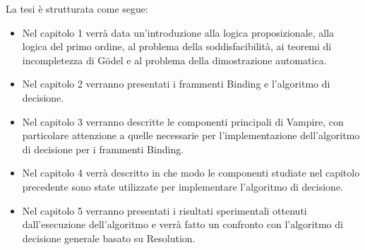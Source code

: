 \documentclass[./main.tex]{subfiles}
\begin{document}
La tesi è strutturata come segue:
\begin{itemize}
    \item Nel capitolo 1 verrà data un'introduzione 
    alla logica proposizionale, alla logica del primo ordine, al problema della soddisfacibilità,
    ai teoremi di incompletezza di Gödel e al problema della dimostrazione automatica.
    \item Nel capitolo 2 verranno presentati i frammenti Binding e l'algoritmo di decisione.
    \item Nel capitolo 3 verranno descritte le componenti principali di Vampire, con particolare attenzione
    a quelle necessarie per l'implementazione dell'algoritmo di decisione per i frammenti Binding.
    \item Nel capitolo 4 verrà descritto in che modo le componenti studiate nel capitolo precedente
    sono state utilizzate per implementare l'algoritmo di decisione.
    \item Nel capitolo 5 verranno presentati i risultati sperimentali ottenuti dall'esecuzione dell'algoritmo
    e verrà fatto un confronto con l'algoritmo di decisione generale basato su Resolution.
\end{itemize}
\end{document}

